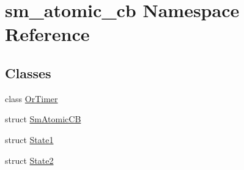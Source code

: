 \hypertarget{namespacesm__atomic__cb}{}\section{sm\+\_\+atomic\+\_\+cb Namespace Reference}
\label{namespacesm__atomic__cb}
\subsection*{Classes}
\begin{DoxyCompactItemize}
\item 
class \hyperlink{classsm__atomic__cb_1_1OrTimer}{Or\+Timer}
\item 
struct \hyperlink{structsm__atomic__cb_1_1SmAtomicCB}{Sm\+Atomic\+CB}
\item 
struct \hyperlink{structsm__atomic__cb_1_1State1}{State1}
\item 
struct \hyperlink{structsm__atomic__cb_1_1State2}{State2}
\end{DoxyCompactItemize}
